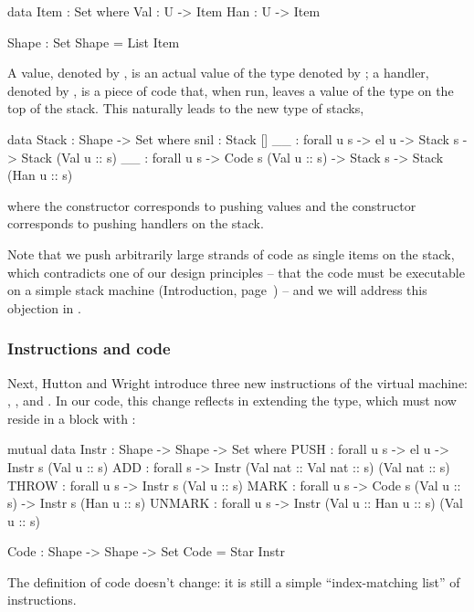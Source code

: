 \begin{code}
  data Item : Set where
    Val : U -> Item
    Han : U -> Item

  Shape : Set
  Shape = List Item
\end{code}
A value, denoted by , is an actual value of the type
denoted by ; a handler, denoted by , is a piece of code
that, when run, leaves a value of the type  on the top of the stack.
This naturally leads to the new type of stacks,
\begin{code}
  data Stack : Shape -> Set where
    snil : Stack []
    _\scons\_ : forall {u s} -> el u -> Stack s -> Stack (Val u :: s)
    _\sconsh\_ : forall {u s} -> Code s (Val u :: s) -> Stack s -> Stack (Han u :: s)
\end{code}
where the constructor \ident{\scons\!\!} corresponds to pushing values and the
constructor \ident{\sconsh\!\!} corresponds to pushing handlers on the stack.

Note that we push arbitrarily large strands of code as single items on the stack,
which contradicts one of our design principles -- that the
code must be executable on a simple stack machine (Introduction, page~\pageref{objectives})
-- and we will address this objection in .

\subsubsection{Instructions and code}

Next, Hutton and Wright introduce three new instructions of the virtual machine:
, , and . In our code, this change
reflects in extending the  type, which must now reside in a
 block with :

\begin{code}
  mutual
    data Instr : Shape -> Shape -> Set where
      PUSH : forall {u s} -> el u -> Instr s (Val u :: s)
      ADD : forall s -> Instr (Val nat :: Val nat :: s) (Val nat :: s)
      THROW : forall {u s} -> Instr s (Val u :: s)
      MARK : forall {u s} -> Code s (Val u :: s) -> Instr s (Han u :: s)
      UNMARK : forall {u s} -> Instr (Val u :: Han u :: s) (Val u :: s)

    Code : Shape -> Shape -> Set
    Code = Star Instr
\end{code}

\noindent The definition of code doesn't change: it is still a simple
``index-matching list'' of instructions.

